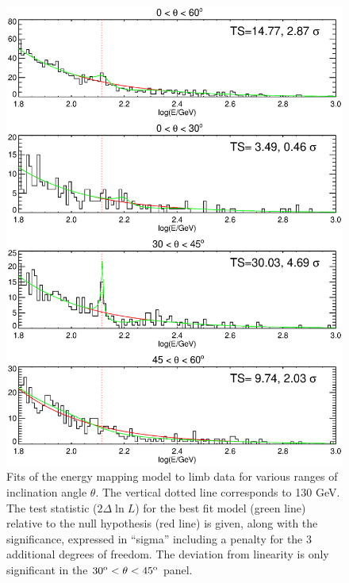 \documentclass[aps,twocolumn,prd,superscriptaddress,showpacs,nofootinbib,fixfloat]{revtex4}
\newcommand{\degree}{^{\rm o}}
\begin{document}
\begin{figure}[p]
\centering
\includegraphics[width=1.0\linewidth]{plots/limbfits.ps}
\caption{Fits of the energy mapping model to limb data for various ranges of
  inclination angle $\theta$.  The vertical dotted line corresponds to 130
  GeV.  The test statistic ($2\Delta\ln L$) for the best fit model (green
  line) relative to the null hypothesis (red line) is given, along with the
  significance, expressed in ``sigma'' including a penalty for the 3
  additional degrees of freedom.  The deviation from linearity is only
  significant in the $30\degree < \theta < 45\degree$ panel.}
\label{fig:limbfits}
\end{figure}
\end{document}
